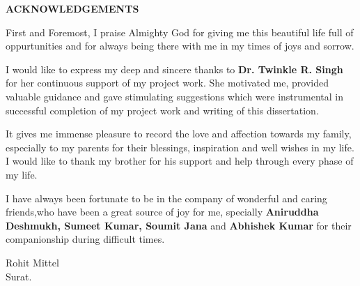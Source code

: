 \clearpage
\begin{centering}
{\Large \textbf{ACKNOWLEDGEMENTS}}\\
\vspace{\baselineskip}
\end{centering}

First and Foremost, I praise Almighty God for giving me this beautiful life full of oppurtunities and for always being there with me in my times of joys and sorrow.

I would like to express my deep and sincere thanks to \textbf{Dr. Twinkle R. Singh} for her continuous support of my project work. She motivated me, provided valuable guidance and gave stimulating suggestions which were instrumental in successful completion of my project work and writing of this dissertation.

It gives me immense pleasure to record the love and affection towards my family, especially to my parents for their blessings, inspiration and well wishes in my life. I would like to thank my brother for his support and help through every phase of my life.

I have always been fortunate to be in the company of wonderful and caring friends,who have been a great source of joy for me, specially \textbf{Aniruddha Deshmukh, Sumeet Kumar, Soumit Jana} and \textbf{Abhishek Kumar} for their companionship during difficult times.
\vspace{4em}
\begin{flushright}

Rohit Mittel \\
Surat.
\end{flushright}
\clearpage
